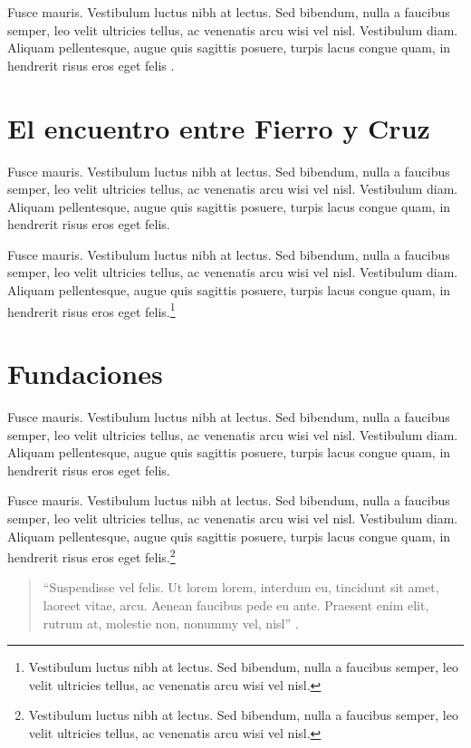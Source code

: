 Fusce mauris. Vestibulum luctus nibh at lectus. Sed bibendum, nulla a faucibus semper, leo velit ultricies tellus, ac venenatis arcu wisi vel nisl. Vestibulum diam. Aliquam pellentesque, augue quis sagittis posuere, turpis lacus congue quam, in hendrerit risus eros eget felis \parencite{@3188-SHELLY2023}.

\section{El encuentro entre Fierro y Cruz}

Fusce mauris. Vestibulum luctus nibh at lectus. Sed bibendum, nulla a faucibus semper, leo velit ultricies tellus, ac venenatis arcu wisi vel nisl. Vestibulum diam. Aliquam pellentesque, augue quis sagittis posuere, turpis lacus congue quam, in hendrerit risus eros eget felis.

Fusce mauris. Vestibulum luctus nibh at lectus. Sed bibendum, nulla a faucibus semper, leo velit ultricies tellus, ac venenatis arcu wisi vel nisl. Vestibulum diam. Aliquam pellentesque, augue quis sagittis posuere, turpis lacus congue quam, in hendrerit risus eros eget felis.\footnote{Vestibulum luctus nibh at lectus. Sed bibendum, nulla a faucibus semper, leo velit ultricies tellus, ac venenatis arcu wisi vel nisl.}

\section{Fundaciones}

Fusce mauris. Vestibulum luctus nibh at lectus. Sed bibendum, nulla a faucibus semper, leo velit ultricies tellus, ac venenatis arcu wisi vel nisl. Vestibulum diam. Aliquam pellentesque, augue quis sagittis posuere, turpis lacus congue quam, in hendrerit risus eros eget felis.

Fusce mauris. Vestibulum luctus nibh at lectus. Sed bibendum, nulla a faucibus semper, leo velit ultricies tellus, ac venenatis arcu wisi vel nisl. Vestibulum diam. Aliquam pellentesque, augue quis sagittis posuere, turpis lacus congue quam, in hendrerit risus eros eget felis.\footnote{Vestibulum luctus nibh at lectus. Sed bibendum, nulla a faucibus semper, leo velit ultricies tellus, ac venenatis arcu wisi vel nisl.}

\begin{quote}
	\enquote{Suspendisse vel felis. Ut lorem lorem, interdum eu, tincidunt sit amet, laoreet vitae, arcu. Aenean faucibus pede eu ante. Praesent enim elit, rutrum at, molestie non, nonummy vel, nisl} \parencite{@3189-QUIROGA2017}.
\end{quote}

